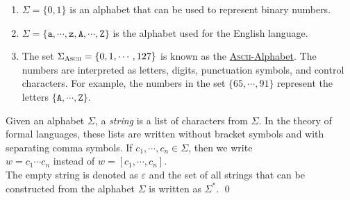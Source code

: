 \examplesEng
\begin{enumerate}
\item $\Sigma = \{ 0, 1\}$ is an alphabet that can be used to represent binary numbers.
\item $\Sigma = \{ \mathtt{a}, \cdots, \mathtt{z}, \mathtt{A}, \cdots, \mathtt{Z} \}$ 
      is the alphabet used for the English language.
\item The set $\Sigma_{\textsc{\scriptsize Ascii}} = \{ 0, 1, \cdots, 127 \}$ is known as the
      \href{http://en.wikipedia.org/wiki/ASCII}{\textsc{Ascii}-Alphabet}.  The numbers are
      interpreted as letters, digits, punctuation symbols, and control characters.
      For example, the numbers in the set $\{65, \cdots, 91 \}$ represent the letters
      $\{\mathtt{A}, \cdots, \mathtt{Z}\}$.  
      \eox
\end{enumerate}

\begin{Definition}[Strings]
Given an alphabet $\Sigma$, a \emph{string} is a list of characters from $\Sigma$.
In the theory of formal languages, these lists are written without bracket symbols and with
separating comma symbols.  If $c_1,\cdots,c_n \in \Sigma$, then we write 
\\[0.2cm]
\hspace*{1.3cm}
$w = c_1\cdots c_n$ \quad instead of \quad $w = [c_1,\cdots,c_n]$.
\\[0.2cm]
The empty string is denoted as $\varepsilon$ and  the set of all strings that can be constructed
from the alphabet $\Sigma$ is written as $\Sigma^*$.
\qed
\end{Definition}

